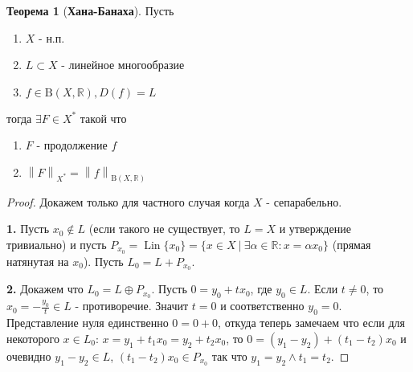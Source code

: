\documentclass[12pt,a4paper]{article}
\theoremstyle{definition}
\newtheorem{theorem}{Теорема}
\newcommand{\Real}{\mathbb{R}}
\newcommand{\norm}[1]{\left\lVert#1\right\rVert}
\newcommand{\setbuild}[2]{\{#1\:|\:#2\}}
\DeclareMathOperator{\Lin}{Lin}
\newcommand{\bounded}[2]{\textrm{B}(#1, #2)}
\begin{document}
\begin{theorem}[\textbf{Хана-Банаха}]
	Пусть 
	\begin{enumerate}
		\item $X$ - н.п.
		\item $L\subset X$ - линейное многообразие
		\item $f\in \bounded{X}{\Real}, D(f) = L$
	\end{enumerate}
	тогда $\exists F\in X^*$ такой что
	\begin{enumerate}
		\item $F$ - продолжение $f$
		\item $\norm{F}_{X^*} = \norm{f}_{\bounded{X}{\Real}}$
	\end{enumerate}
\end{theorem}
\begin{proof}
	Докажем только для частного случая когда $X$ - сепарабельно. \newline \newline
	
	\textbf{1.} Пусть $x_0 \notin L$ (если такого не существует, то $L=X$ и утверждение тривиально) и пусть $P_{x_0} = \Lin{\{x_0\}} = 
	\setbuild{x\in X}{\exists\alpha\in\Real: x=\alpha x_0}$ (прямая натянутая на $x_0$). Пусть $L_0 = L + P_{x_0}$. \newline
	\newline
	
	\textbf{2.} Докажем что $L_0 = L\oplus P_{x_0}$. \newline
	Пусть $0=y_0 + tx_0$, где $y_0\in L$. Если $t\neq0$, то $x_0 = -\frac{y_0}{t} \in L$ - противоречие. Значит $t=0$ и соответственно $y_0 = 0$. Представление нуля единственно $0 = 0 + 0$, откуда теперь замечаем что если для некоторого $x\in L_0$: $x = y_1 + t_1 x_0 = y_2 + t_2 x_0$, то $0 = (y_1 - y_2) + (t_1 - t_2) x_0$ и очевидно $y_1 - y_2 \in L$, $(t_1 - t_2)x_0 \in P_{x_0}$ так что $y_1 = y_2 \wedge t_1 = t_2$. \newline
	\newpage
	

\end{proof}
\end{document}
